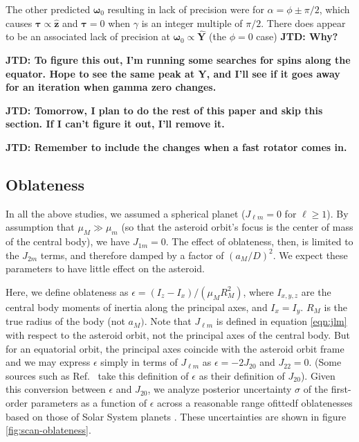 \documentclass[fleqn,usenatbib]{mnras}
\newcommand{\jtd}[1]{ {\bf{\color{red} JTD: #1}} }
\newcommand{\unit}[1]{\bm{\hat{#1}}}
\begin{document}
The other predicted $\bm \omega_0$ resulting in lack of precision were for $\alpha = \phi \pm \pi/2$, which causes $\bm \tau \propto \unit z$ and $\bm \tau = 0$ when $\gamma$ is an integer multiple of $\pi/2$. There does appear to be an associated lack of precision at $\bm \omega_0 \propto \unit Y$ (the $\phi=0$ case) \jtd{Why?}

\jtd{To figure this out, I'm running some searches for spins along the equator. Hope to see the same peak at Y, and I'll see if it goes away for an iteration when gamma zero changes.}

\jtd{Tomorrow, I plan to do the rest of this paper and skip this section. If I can't figure it out, I'll remove it.}

\jtd{Remember to include the changes when a fast rotator comes in.}



\subsection{Oblateness}
\label{sec:scan-oblateness}

In all the above studies, we assumed a spherical planet ($J_{\ell m} = 0$ for $\ell \geq 1$). By assumption that $\mu_M \gg \mu_m$ (so that the asteroid orbit's focus is the center of mass of the central body), we have $J_{1m} = 0$. The effect of oblateness, then, is limited to the $J_{2m}$ terms, and therefore damped by a factor of $(a_M / D)^2$. We expect these parameters to have little effect on the asteroid.

Here, we define oblateness as $\epsilon = (I_z - I_x)/(\mu_M R_M^2)$, where  $I_{x,y,z}$ are the central body moments of inertia along the principal axes, and $I_x = I_y$. $R_M$ is the true radius of the body (not $a_M)$. Note that $J_{\ell m}$ is defined in equation \ref{eqn:jlm} with respect to the asteroid orbit, not the principal axes of the central body. But for an equatorial orbit, the principal axes coincide with the asteroid orbit frame and we may express $\epsilon$ simply in terms of $J_{\ell m}$ as $\epsilon = -2J_{20}$ and $J_{22} = 0$. (Some sources such as Ref.~\cite{paterLissauer2015} take this definition of $\epsilon$ as their definition of $J_{20}$). Given this conversion between $\epsilon$ and $J_{20}$, we analyze posterior uncertainty $\sigma$ of the first-order parameters as a function of $\epsilon$ across a reasonable range ofittedf oblatenesses based on those of Solar System planets \cite{paterLissauer2015}. These uncertainties are shown in figure \ref{fig:scan-oblateness}.
\end{document}
